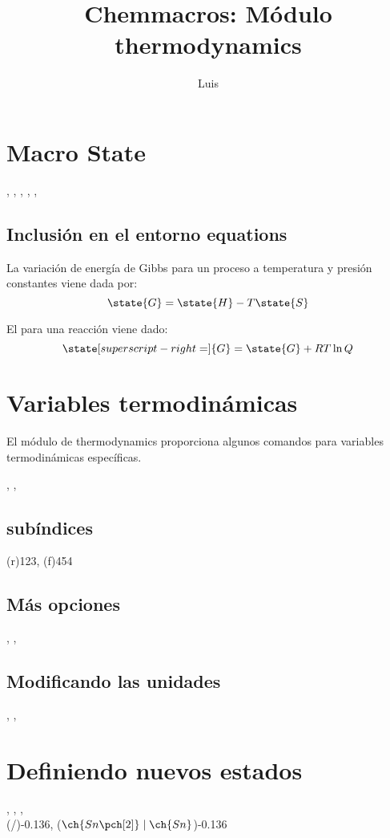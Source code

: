 \documentclass[10pt,a4paper]{article}
\title{Chemmacros: Módulo thermodynamics}
\author{Luis}
\date{}
\begin{document}
\maketitle
\section{Macro State}
, 
, 
, 
, 
, 

\subsection{Inclusión en el entorno equations}
La variación de energía de Gibbs para un proceso a temperatura y presión constantes viene dada por: 
\begin{equation*}
\state{G} = \state{H} - T\state{S}
\end{equation*}

El  para una reacción viene dado:
\begin{equation*}
\state[superscript-right=]{G} = \state{G} + RT \ln Q
\end{equation*}

\section{Variables termodinámicas}
El módulo de thermodynamics proporciona algunos comandos para variables termodinámicas específicas.

, , 

\subsection{subíndices}
\enthalpy(r){123}, \enthalpy(f){454}

\subsection{Más opciones}
, 
,

\subsection{Modificando las unidades}
, 
, 

\section{Definiendo nuevos estados}
, , , 
\\ 
\ElPotC(/){-0.136}, \ElPotC($\ch{Sn\pch[2]}\mid\ch{Sn}$){-0.136}
\end{document}
